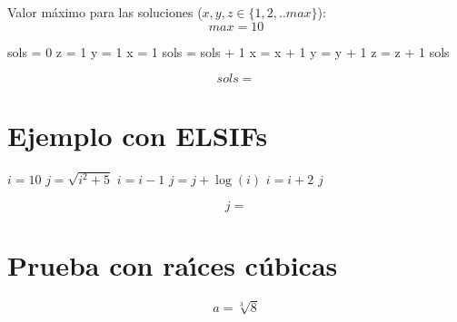 \documentclass{article}
\begin{document}
Valor m\'aximo para las soluciones ($x, y, z \in \{1,2,..max\}$):
\begin{equation}
max = 10
\label{eq:calc:max}
\end{equation}



\begin{algorithm}
\caption{N\'umero de soluciones}
\label{alg:calc:sols}
\begin{algorithmic}
    \STATE sols = 0
    \STATE z = 1
        \STATE y = 1
            \STATE x = 1
                    \STATE sols = sols + 1
                \ENDIF
                \STATE x = x + 1
            \ENDWHILE
            \STATE y = y + 1
        \ENDWHILE
        \STATE z = z + 1
    \ENDWHILE
    \RETURN sols
\end{algorithmic}
\end{algorithm}

\begin{equation}
    sols = 
    \label{eq:res:sols}
\end{equation}


\section{Ejemplo con ELSIFs}

\begin{algorithm}
\caption{Ejemplo de un algoritmo con ELSIFs anidados}
\label{alg:calc:j}
\begin{algorithmic}
        \STATE $i = 10$
        \STATE $j = \sqrt{i^2 + 5}$
            \STATE $i = i - 1$
                \STATE $j = j + \log(i)$
            \ENDWHILE
            \STATE $i = i + 2$
        \ENDIF
        \RETURN $j$
\end{algorithmic}
\end{algorithm}



\begin{equation}
    j = 
    \label{eq:res:j}
\end{equation}

\section{Prueba con ra\'{\i}ces c\'ubicas}
\begin{equation}
    a = \sqrt[3]{8}
    \label{eq:calc:a}
\end{equation}
\end{document}
